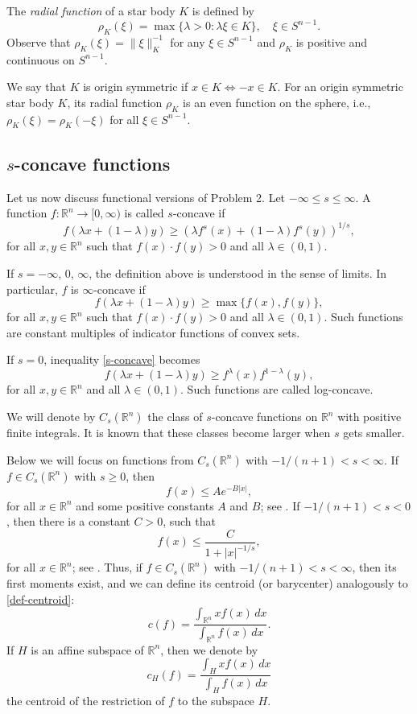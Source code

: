\documentclass[12pt,letterpaper,reqno]{amsart}
\theoremstyle{definition}
\begin{document}
	The {\it radial function} of a star body $K$ is defined by
	$$
	\rho_K(\xi) = \max \{\lambda > 0: \lambda \xi \in K \}, \quad \xi \in S^{n-1}.
	$$
	Observe that $\rho_K(\xi) = \|\xi\|_K^{-1}$ for any $\xi \in S^{n-1}$ and $\rho_K$ is positive and continuous on $S^{n-1}$.
	
	
	We say that $K$ is origin symmetric if $x\in K \Leftrightarrow -x \in K$. For an origin symmetric star body $K$, its radial function $\rho_K$ is an even function on the sphere, i.e.,  $\rho_K(\xi)=\rho_K(-\xi) $ for all $\xi\in S^{n-1}$.
	
	

\subsection{$s$-concave functions}	
	
Let us now discuss functional versions of Problem 2. Let $-\infty \le s\le \infty$.   A function $f: \mathbb R^n\to \mathbb [0,\infty)$ is called $s$-concave  if  
\begin{equation}\label{s-concave}
	f(\lambda x + (1-\lambda)y)\ge \left(\lambda f^s(x)+ (1-\lambda)f^s(y)\right)^{1/s},
\end{equation}
for all $x, y\in \mathbb R^n$ such that $f(x)\cdot f(y)>0$ and all $\lambda\in (0,1)$.

If $s =-\infty$, $0$, $\infty$, the definition above is understood in the sense of limits. In particular, 
$f$ is $\infty$-concave if 
$$f(\lambda x + (1-\lambda)y)\ge\max\{f(x),f(y)\},$$
for all $x, y\in \mathbb R^n$ such that $f(x)\cdot f(y)>0$ and all $\lambda\in (0,1)$. Such functions are constant multiples of indicator functions of convex sets. 

If $s=0$,  inequality \eqref{s-concave}  becomes 
$$f(\lambda x + (1-\lambda)y)\ge   f^\lambda(x) f^{1-\lambda}(y),$$
for all $x, y\in \mathbb R^n$   and all $\lambda\in (0,1)$. Such functions are called log-concave.

We will denote by $C_s(\mathbb R^n)$ the class of $s$-concave functions  on $\mathbb R^n$ with positive finite integrals. It is known that these classes become larger when $s$ gets smaller. 


Below we will focus on  functions from $C_s(\mathbb R^n)$ with $-1/(n+1)<s<\infty$. If $f\in C_s(\mathbb R^n)$ with $s\ge 0$, then $$f(x)\le Ae^{-B|x|},$$ for all $x\in \mathbb R^n$ and some positive constants $A$ and $B$; see \cite[Lemma 2.2.1]{BGVV}. If $-1/(n+1)<s<0$,   then there is a constant $C>0$, such that 
\begin{equation}\label{s-conc}
	f(x)\le \frac{C}{1+|x|^{-1/s}},
\end{equation}
for all $x\in \mathbb R^n$; see \cite{B}. Thus, if $f\in C_s(\mathbb R^n)$ with $-1/(n+1)<s<\infty$, then its first moments exist, and we can define
 its centroid (or barycenter)   analogously to  \eqref{def-centroid}:
$$c(f) = \frac{\int_{\mathbb R^n} x f(x)\, dx}{\int_{\mathbb R^n} f(x)\, dx} .$$
If $H$ is an affine subspace of $\mathbb R^n$, then we denote
by 
$$c_H(f)=\frac{\int_{H} x f(x)\, dx}{\int_{ H} f(x)\, dx} $$ the centroid of the restriction of $f$ to the subspace $H$. 
\end{document}
